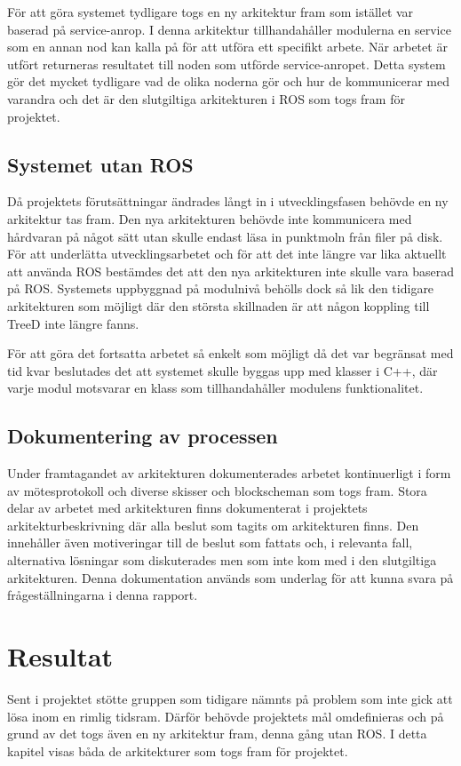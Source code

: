 För att göra systemet tydligare togs en ny arkitektur fram som istället var baserad på service-anrop. I denna arkitektur tillhandahåller modulerna en service som en annan nod kan kalla på för att utföra ett specifikt arbete. När arbetet är utfört returneras resultatet till noden som utförde service-anropet. Detta system gör det mycket tydligare vad de olika noderna gör och hur de kommunicerar med varandra och det är den slutgiltiga arkitekturen i ROS som togs fram för projektet.

\subsection{Systemet utan ROS}
Då projektets förutsättningar ändrades långt in i utvecklingsfasen behövde en ny arkitektur tas fram. Den nya arkitekturen behövde inte kommunicera med hårdvaran på något sätt utan skulle endast läsa in punktmoln från filer på disk. För att underlätta utvecklingsarbetet och för att det inte längre var lika aktuellt att använda ROS bestämdes det att den nya arkitekturen inte skulle vara baserad på ROS. Systemets uppbyggnad på modulnivå behölls dock så lik den tidigare arkitekturen som möjligt där den största skillnaden är att någon koppling till TreeD inte längre fanns.

För att göra det fortsatta arbetet så enkelt som möjligt då det var begränsat med tid kvar beslutades det att systemet skulle byggas upp med klasser i C++, där varje modul motsvarar en klass som tillhandahåller modulens funktionalitet.

\subsection{Dokumentering av processen}
Under framtagandet av arkitekturen dokumenterades arbetet kontinuerligt i form av mötesprotokoll och diverse skisser och blockscheman som togs fram. Stora delar av arbetet med arkitekturen finns dokumenterat i projektets arkitekturbeskrivning där alla beslut som tagits om arkitekturen finns. Den innehåller även motiveringar till de beslut som fattats och, i relevanta fall, alternativa lösningar som diskuterades men som inte kom med i den slutgiltiga arkitekturen. Denna dokumentation används som underlag för att kunna svara på frågeställningarna i denna rapport.


\section{Resultat}
\label{sec:results-lundberg}
Sent i projektet stötte gruppen som tidigare nämnts på problem som inte gick att lösa inom en rimlig tidsram. Därför behövde projektets mål omdefinieras och på grund av det togs även en ny arkitektur fram, denna gång utan ROS. I detta kapitel visas båda de arkitekturer som togs fram för projektet.

